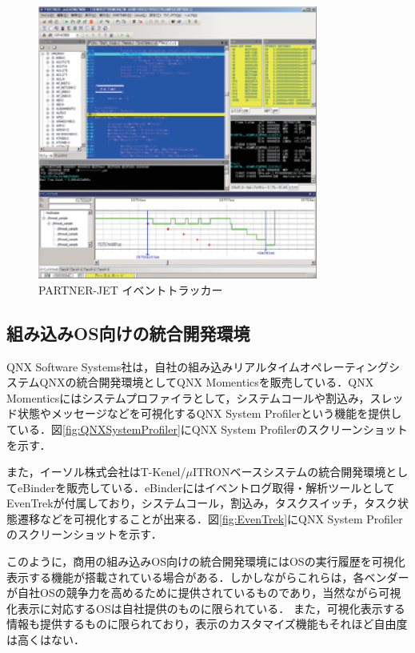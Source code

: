 \begin{figure}[p]
\begin{center}
\includegraphics[height=9cm]{img/PARTNER-JET.eps}
\caption{PARTNER-JET イベントトラッカー}
\label{fig:PARTNER-JET}
\end{center}
\end{figure}

\subsection{組み込みOS向けの統合開発環境}

QNX Software Systems社は，自社の組み込みリアルタイムオペレーティングシステムQNXの統合開発環境としてQNX Momenticsを販売している．QNX Momenticsにはシステムプロファイラとして，システムコールや割込み，スレッド状態やメッセージなどを可視化するQNX System Profiler\cite{QNXMomentics}という機能を提供している．図\ref{fig:QNXSystemProfiler}にQNX System Profilerのスクリーンショットを示す．

また，イーソル株式会社はT-Kenel/$\mu$ITRONベースシステムの統合開発環境としてeBinder\cite{eBinder}を販売している．eBinderにはイベントログ取得・解析ツールとしてEvenTrekが付属しており，システムコール，割込み，タスクスイッチ，タスク状態遷移などを可視化することが出来る．図\ref{fig:EvenTrek}にQNX System Profilerのスクリーンショットを示す．

このように，商用の組み込みOS向けの統合開発環境にはOSの実行履歴を可視化表示する機能が搭載されている場合がある．しかしながらこれらは，各ベンダーが自社OSの競争力を高めるために提供されているものであり，当然ながら可視化表示に対応するOSは自社提供のものに限られている．
また，可視化表示する情報も提供するものに限られており，表示のカスタマイズ機能もそれほど自由度は高くはない．

